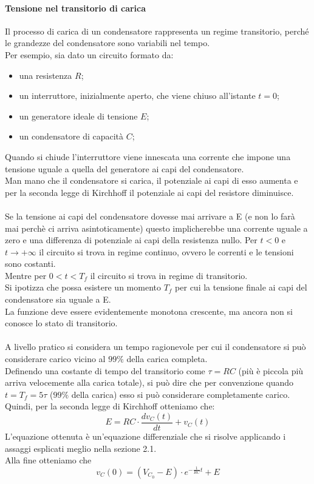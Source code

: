 \documentclass[../main.tex]{subfiles}
\begin{document}
	\paragraph{Tensione nel transitorio di carica}
	Il processo di carica di un condensatore rappresenta un regime transitorio, perché le grandezze del condensatore sono variabili nel tempo.\\
	Per esempio, sia dato un circuito formato da:
	\begin{itemize}
		\item una resistenza $R$;
		\item un interruttore, inizialmente aperto, che viene chiuso all’istante $t=0$;
		\item un generatore ideale di tensione $E$;
		\item un condensatore di capacità $C$;
	\end{itemize}
	Quando si chiude l’interruttore viene innescata una corrente che impone una tensione uguale a quella del generatore ai capi del condensatore. \\
	Man mano che il condensatore si carica, il potenziale ai capi di esso aumenta e per la seconda legge di Kirchhoﬀ il potenziale ai capi del resistore diminuisce.\\\\
	Se la tensione ai capi del condensatore dovesse mai arrivare a E (e non lo farà mai perchè ci arriva asintoticamente) questo implicherebbe una corrente uguale a zero e una diﬀerenza di potenziale ai capi della resistenza nullo.
	Per $t<0$ e $t \to +\infty$  il circuito si trova in regime continuo, ovvero le correnti e le tensioni sono costanti.\\
	Mentre per $0<t<T_f$ il circuito si trova in regime di transitorio.\\
	Si ipotizza che possa esistere un momento $T_f$ per cui la tensione finale ai capi del condensatore sia uguale a E. \\
	La funzione deve essere evidentemente monotona crescente, ma ancora non si conosce lo stato di transitorio.\\\\
	A livello pratico si considera un tempo ragionevole per cui il condensatore si può considerare carico vicino al $99\%$ della carica completa. \\
	Definendo una costante di tempo del transitorio come $\tau = RC$ (più è piccola più arriva velocemente alla carica totale), si può dire che per convenzione quando $t = T_f = 5\tau$ ($99\%$ della carica) esso si può considerare completamente carico.
	Quindi, per la seconda legge di Kirchhoﬀ otteniamo che:
	\[E = RC \cdot \frac{d v_C(t)}{dt} + v_C(t)\]
	L'equazione ottenuta è un'equazione differenziale che si risolve applicando i assaggi esplicati meglio nella sezione 2.1.\\
	Alla fine otteniamo che
	\begin{equation}
		v_C(0) = (V_{C_0} - E) \cdot e^{-\frac{1}{RC}t}+E
	\end{equation}
\end{document}
